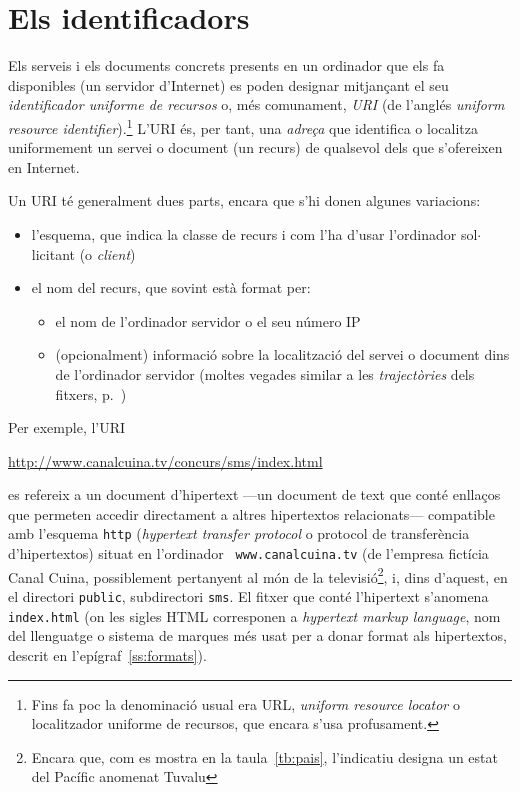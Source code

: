 \section{Els identificadors}

Els serveis i els documents concrets presents en un ordinador que els
fa disponibles (un servidor d'Internet) es poden designar
mitjançant el seu \emph{identificador uniforme de recursos} o,
més comunament, \emph{URI} (de l'anglés \emph{uniform resource
  identifier}).\footnote{Fins fa poc la denominació usual era URL,
  \emph{uniform resource locator} o localitzador uniforme de recursos,
  que encara s'usa profusament.} L'URI és, per tant, una
\emph{adreça} que identifica o localitza uniformement un servei o
document (un recurs) de qualsevol dels que s'ofereixen en Internet.

Un URI té generalment dues parts, encara que s'hi donen algunes
variacions:
\begin{itemize}
\item l'esquema, que indica la classe de recurs i com l'ha d'usar
      l'ordinador sol$\cdot$licitant (o \emph{client})
\item el nom del recurs, que sovint està format per:
  \begin{itemize}
  \item el nom de l'ordinador servidor o el seu número IP
  \item (opcionalment) informació sobre la localització del
    servei o document dins de l'ordinador servidor (moltes vegades
    similar a les \emph{trajectòries} dels fitxers, p.~\pageref{pg:fitxer})
  \end{itemize}
\end{itemize}
Per exemple, l'URI
\begin{center}
\url{http://www.canalcuina.tv/concurs/sms/index.html}
\end{center}
es refereix a un document d'hipertext ---un
  document de text que conté enllaços que permeten accedir
  directament a altres hipertextos relacionats--- compatible amb 
l'esquema {\tt http} (\emph{hypertext transfer protocol} o protocol de
transferència d'hipertextos) situat en l'ordinador {\tt
  www.canalcuina.tv} (de l'empresa fictícia Canal Cuina,
  possiblement pertanyent al món de la televisió\footnote{Encara que,
  com es mostra en la taula~\ref{tb:pais}, l'indicatiu designa un estat
  del Pacífic anomenat Tuvalu}, i, dins d'aquest, 
  en el directori {\tt public},
subdirectori {\tt sms}. El fitxer que conté l'hipertext s'anomena
{\tt index.html} (on les sigles HTML corresponen a \emph{hypertext
  markup language}, nom del llenguatge o sistema de marques més usat
per a donar format als hipertextos, descrit en
l'epígraf~\ref{ss:formats}).


